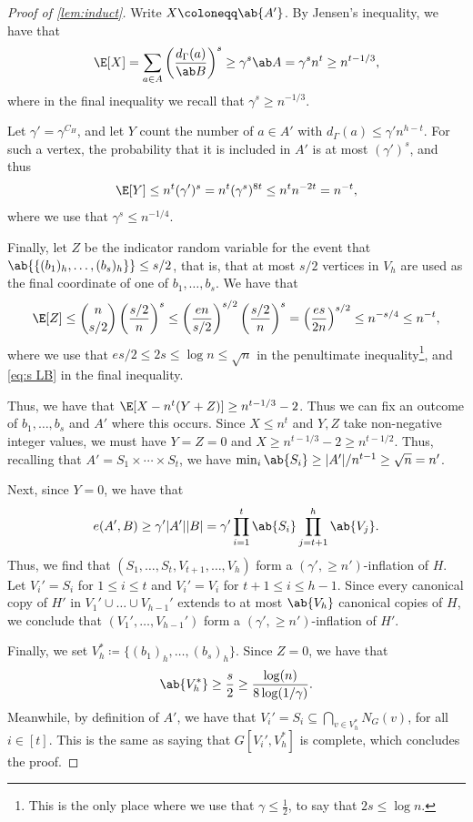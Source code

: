 \begin{proof}[Proof of \cref{lem:induct}]
Write $X\coloneqq\ab{A'}$. By Jensen's inequality, we have that 
\[
\E[X] = \sum_{a\in A}\left(\frac{d_\Gamma(a)}{\ab B}\right)^s \ge \gamma^s \ab A = \gamma^s n^t\ge n^{t-1/3},
\]
where in the final inequality we recall that $\gamma^s \geq n^{-1/3}$.

Let $\gamma'=\gamma^{C_H}$, and let $Y$ count the number of $a\in A'$ with $d_\Gamma(a)\le \gamma' n^{h-t}$. For such a vertex, the probability that it is included in $A'$ is at most $(\gamma')^s$, and thus 
\[\E[Y]\le n^t(\gamma')^{s}=n^t (\gamma^s)^{8t} \leq n^t n^{-2t} = n^{-t},\]
where we use that $\gamma^s \leq n^{-1/4}$.

Finally, let $Z$ be the indicator random variable for the event that $\ab{\{(b_1)_h,\dots,(b_s)_h\}}\leq s/2$, that is, that at most $s/2$ vertices in $V_h$ are used as the final coordinate of one of $b_1,\dots,b_s$. We have that 
\[
\E[Z] \leq \binom{n}{s/2} \left(\frac{s/2}{n}\right)^s \leq \left(\frac{en}{s/2}\right)^{s/2} \left(\frac{s/2}{n}\right)^s = \left(\frac{es}{2n}\right)^{s/2} \leq n^{-s/4} \leq n^{-t},
\]
where we use that $es/2 \leq 2s \leq \log n \leq \sqrt n$ in the penultimate inequality\footnote{This is the only place where we use that $\gamma \leq \frac 12$, to say that $2s \leq \log n$.}, and \eqref{eq:s LB} in the final inequality.

Thus, we have that $\E[X-n^t(Y+Z)]\geq n^{t-1/3}-2$. Thus we can fix an outcome of $b_1,\dots,b_s$ and $A'$ where this occurs. Since $X\le n^t$ and $Y,Z$ take non-negative integer values, we must have $Y=Z =0$ and $X\ge n^{t-1/3}-2 \geq n^{t-1/2}$. Thus, recalling that $A' = S_1\times \dotsb \times S_t$, we have $\min_i\ab{S_i} \ge |A'|/n^{t-1} \ge \sqrt{n}=n'$. 

Next, since $Y=0$, we have that $$e(A',B)\ge \gamma'|A'||B| = \gamma' \prod_{i=1}^t\ab{S_i} \prod_{j=t+1}^{h}\ab{V_j}.$$ 
Thus, we find that $(S_1,\dots,S_t,V_{t+1},\dots,V_h)$ form a $(\gamma',\geq n')$-inflation of $H$. Let $V_i' = S_i$ for $1 \leq i \leq t$ and $V_i' = V_i$ for $t+1 \leq i \leq h-1$.
Since every canonical copy of $H'$ in $V_1' \cup \dots \cup V_{h-1}'$ extends to at most $\ab{V_h}$ canonical copies of $H$, we conclude that $(V_1',\dots,V_{h-1}')$ form a $(\gamma', \geq n')$-inflation of $H'$.


Finally, we set $V_h^*\coloneqq  \{(b_1)_h,\dots,(b_s)_h\}$. Since $Z =0$, we have that  
\[
\ab{V_h^*} \geq \frac{s}{2} \geq \frac{\log(n)}{8\log(1/\gamma)}.
\]
Meanwhile, by definition of $A'$, we have that $V_i'= S_i \subseteq \bigcap_{v\in V_h^*}N_G(v)$, for all $i \in [t]$. This is the same as saying that $G[V_i', V_h^*]$ is complete, which concludes the proof.    
\end{proof}

